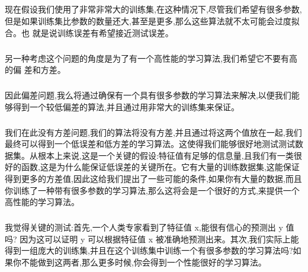 \documentclass{article}
\begin{document}
\begin{CJK}{UTF8}{gbsn}
\subparagraph{}
现在假设我们使用了非常非常大的训练集,在这种情况下,尽管我们希望有很多参数,
但是如果训练集比参数的数量还大,甚至是更多,那么这些算法就不太可能会过度拟合。也
就是说训练误差有希望接近测试误差。
\subparagraph{}
另一种考虑这个问题的角度是为了有一个高性能的学习算法,我们希望它不要有高的偏
差和方差。
\begin{figure}[H]
\label{fig:699}
\end{figure}
\begin{figure}[H]
\label{fig:700}
\end{figure}
\subparagraph{}
因此偏差问题,我么将通过确保有一个具有很多参数的学习算法来解决,以便我们能够得到一个较低偏差的算法,并且通过用非常大的训练集来保证。
\subparagraph{}
我们在此没有方差问题,我们的算法将没有方差,并且通过将这两个值放在一起,我们
最终可以得到一个低误差和低方差的学习算法。这使得我们能够很好地测试测试数据集。从根本上来说,这是一个关键的假设:特征值有足够的信息量,且我们有一类很好的函数,这是为什么能保证低误差的关键所在。它有大量的训练数据集,这能保证得到更多的方差值,因此这给我们提出了一些可能的条件,如果你有大量的数据,而且你训练了一种带有很多参数的学习算法,那么这将会是一个很好的方式,来提供一个高性能的学习算法。
\subparagraph{}
我觉得关键的测试:首先,一个人类专家看到了特征值 x,能很有信心的预测出 y 值吗?
因为这可以证明 y 可以根据特征值 x 被准确地预测出来。其次,我们实际上能得到一组庞大的训练集,并且在这个训练集中训练一个有很多参数的学习算法吗?如果你不能做到这两者,那么更多时候,你会得到一个性能很好的学习算法。
\begin{figure}[H]
\label{fig:6667}
\end{figure}
\begin{figure}[H]
\label{fig:6668}
\end{figure}
\begin{figure}[H]
\label{fig:6669}
\end{figure}
\begin{figure}[H]
\label{fig:6670}
\end{figure}
\begin{figure}[H]
\label{fig:6671}
\end{figure}
\begin{figure}[H]
\label{fig:6672}
\end{figure}
\begin{figure}[H]
\label{fig:6673}
\end{figure}
\begin{figure}[H]
\label{fig:6677}
\end{figure}
\end{CJK}
\end{document}
